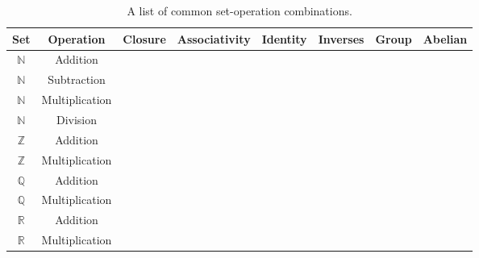 
\begin{table}[h]
	\centering
	\label{sets_and_operations_table}
	\caption{A list of common set-operation combinations.}
	\vspace{-0.3cm}
	\begin{tabular}{cccccccc}
		\toprule
		\bfseries Set & \bfseries Operation & \bfseries Closure & \bfseries Associativity & \bfseries Identity & \bfseries Inverses & \bfseries Group & \bfseries Abelian \\
		\midrule
		$\mathbb{N}$ & Addition & \yesicon & \yesicon & \noicon & \naicon & \noicon & \naicon \\
		$\mathbb{N}$ & Subtraction & \noicon & \naicon & \naicon & \naicon & \noicon & \naicon \\
		$\mathbb{N}$ & Multiplication & \yesicon & \yesicon & \yesicon & \noicon & \noicon & \naicon \\
		$\mathbb{N}$ & Division & \noicon & \naicon & \naicon & \naicon & \noicon & \naicon \\
		$\mathbb{Z}$ & Addition & \yesicon & \yesicon & \yesicon & \yesicon & \yesicon & \yesicon \\
		$\mathbb{Z}$ & Multiplication & \yesicon & \yesicon & \yesicon & \noicon & \noicon & \naicon \\
		$\mathbb{Q}$ & Addition & \yesicon & \yesicon & \yesicon & \yesicon & \yesicon & \yesicon \\
		$\mathbb{Q}$ & Multiplication & \yesicon & \yesicon & \yesicon & \noicon & \noicon & \naicon \\
		$\mathbb{R}$ & Addition & \yesicon & \yesicon & \yesicon & \yesicon & \yesicon & \yesicon \\
		$\mathbb{R}$ &  Multiplication & \yesicon & \yesicon & \yesicon & \noicon & \noicon & \naicon \\
		\bottomrule
	\end{tabular}
\end{table}